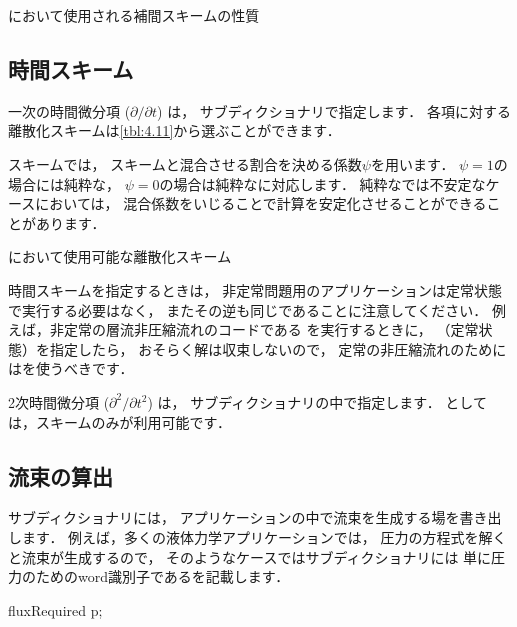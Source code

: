 \begin{table}[ht]
 
 \caption{において使用される補間スキームの性質}
 \label{tbl:4.10}
\end{table}


\subsection{時間スキーム}
\label{ssec:4.4.6}
一次の時間微分項 ($\partial /\partial t$) は，
サブディクショナリで指定します．
各項に対する離散化スキームは\autoref{tbl:4.11}から選ぶことができます．

スキームでは，
スキームと混合させる割合を決める係数$\psi$を用います．
$\psi = 1$の場合には純粋な，
$\psi = 0$の場合は純粋なに対応します．
純粋なでは不安定なケースにおいては，
混合係数をいじることで計算を安定化させることができることがあります．


\begin{table}[ht]
 
 \caption{において使用可能な離散化スキーム}
 \label{tbl:4.11}
\end{table}


時間スキームを指定するときは，
非定常問題用のアプリケーションは定常状態で実行する必要はなく，
またその逆も同じであることに注意してください．
例えば，非定常の層流非圧縮流れのコードである
を実行するときに，
（定常状態）を指定したら，
おそらく解は収束しないので，
定常の非圧縮流れのためにはを使うべきです．

2次時間微分項 ($\partial^{2}/\partial t^{2}$) は，
サブディクショナリの中で指定します．\break
{}としては，スキームのみが利用可能です．


\subsection{流束の算出}
\label{ssec:4.4.7}
サブディクショナリには，
アプリケーションの中で流束を生成する場を書き出します．
例えば，多くの液体力学アプリケーションでは，
圧力の方程式を解くと流束が生成するので，
そのようなケースではサブディクショナリには
単に圧力のためのword識別子であるを記載します．
\begin{OFverbatim}[file]
fluxRequired
{
    p;
}
\end{OFverbatim}



